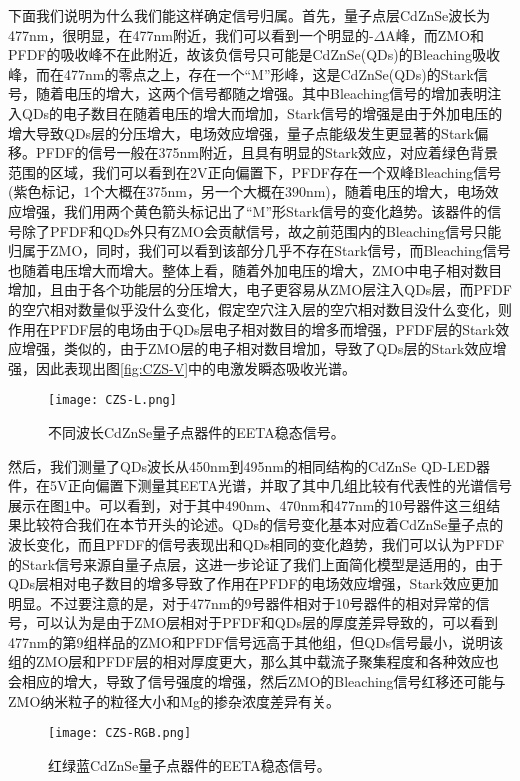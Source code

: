 下面我们说明为什么我们能这样确定信号归属。首先，量子点层CdZnSe波长为477nm，很明显，在477nm附近，我们可以看到一个明显的-$\Delta$A峰，而ZMO和PFDF的吸收峰不在此附近，故该负信号只可能是CdZnSe(QDs)的Bleaching吸收峰，而在477nm的零点之上，存在一个“M”形峰，这是CdZnSe(QDs)的Stark信号，随着电压的增大，这两个信号都随之增强。其中Bleaching信号的增加表明注入QDs的电子数目在随着电压的增大而增加，Stark信号的增强是由于外加电压的增大导致QDs层的分压增大，电场效应增强，量子点能级发生更显著的Stark偏移。PFDF的信号一般在375nm附近，且具有明显的Stark效应，对应着绿色背景范围的区域，我们可以看到在2V正向偏置下，PFDF存在一个双峰Bleaching信号(紫色标记，1个大概在375nm，另一个大概在390nm)，随着电压的增大，电场效应增强，我们用两个黄色箭头标记出了“M”形Stark信号的变化趋势。该器件的信号除了PFDF和QDs外只有ZMO会贡献信号，故之前范围内的Bleaching信号只能归属于ZMO，同时，我们可以看到该部分几乎不存在Stark信号，而Bleaching信号也随着电压增大而增大。整体上看，随着外加电压的增大，ZMO中电子相对数目增加，且由于各个功能层的分压增大，电子更容易从ZMO层注入QDs层，而PFDF的空穴相对数量似乎没什么变化，假定空穴注入层的空穴相对数目没什么变化，则作用在PFDF层的电场由于QDs层电子相对数目的增多而增强，PFDF层的Stark效应增强，类似的，由于ZMO层的电子相对数目增加，导致了QDs层的Stark效应增强，因此表现出图\ref{fig:CZS-V}中的电激发瞬态吸收光谱。
\begin{figure}[ht]
	\centering
	\texttt{[image: CZS-L.png]}
	\caption{不同波长CdZnSe量子点器件的EETA稳态信号。}
	\label{fig:CZS-L}
\end{figure}

然后，我们测量了QDs波长从450nm到495nm的相同结构的CdZnSe QD-LED器件，在5V正向偏置下测量其EETA光谱，并取了其中几组比较有代表性的光谱信号展示在图\ref{fig:CZS-L}中。可以看到，对于其中490nm、470nm和477nm的10号器件这三组结果比较符合我们在本节开头的论述。QDs的信号变化基本对应着CdZnSe量子点的波长变化，而且PFDF的信号表现出和QDs相同的变化趋势，我们可以认为PFDF的Stark信号来源自量子点层，这进一步论证了我们上面简化模型是适用的，由于QDs层相对电子数目的增多导致了作用在PFDF的电场效应增强，Stark效应更加明显。不过要注意的是，对于477nm的9号器件相对于10号器件的相对异常的信号，可以认为是由于ZMO层相对于PFDF和QDs层的厚度差异导致的，可以看到477nm的第9组样品的ZMO和PFDF信号远高于其他组，但QDs信号最小，说明该组的ZMO层和PFDF层的相对厚度更大，那么其中载流子聚集程度和各种效应也会相应的增大，导致了信号强度的增强，然后ZMO的Bleaching信号红移还可能与ZMO纳米粒子的粒径大小和Mg的掺杂浓度差异有关。
\begin{figure}[ht]
	\centering
	\texttt{[image: CZS-RGB.png]}
	\caption{红绿蓝CdZnSe量子点器件的EETA稳态信号。}
	\label{fig:CZS-RGB}
\end{figure}

